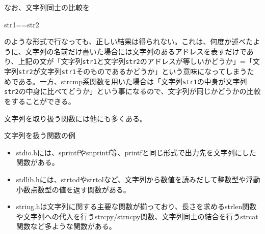 なお、文字列同士の比較を
\begin{code}
str1==str2
\end{code}
のような形式で行なっても、正しい結果は得られない。これは、何度か述べたように、文字列の名前だけ書いた場合には文字列のあるアドレスを表すだけであり、上記の文が「文字列\verb|str1|と文字列\verb|str2|のアドレスが等しいかどうか」=「文字列\verb|str2|が文字列\verb|str1|そのものであるかどうか」という意味になってしまうためである。一方、strcmp系関数を用いた場合は「文字列\verb|str1|の中身が文字列\verb|str2|の中身に比べてどうか」という事になるので、文字列が同じかどうかの比較をすることができる。

文字列を取り扱う関数には他にも多くある。
\begin{itembox}[l]{文字列を扱う関数の例}
\begin{itemize}
\item stdio.hには、sprintfやsnprintf等、printfと同じ形式で出力先を文字列にした関数がある。
\item stdlib.hには、strtodやstrtolなど、文字列から数値を読みだして整数型や浮動小数点数型の値を返す関数がある。
\item string.hは文字列に関する主要な関数が揃っており、長さを求めるstrlen関数や文字列への代入を行うstrcpy/strncpy関数、文字列同士の結合を行うstrcat関数など多ような関数がある。
\end{itemize}
\end{itembox}

